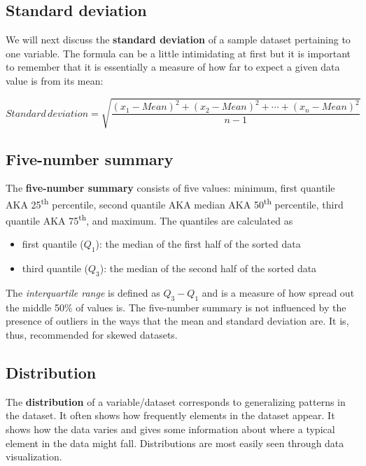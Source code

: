 \documentclass[12pt, krantz2,]{krantz}
\providecommand{\tightlist}{%
  \setlength{\itemsep}{0pt}\setlength{\parskip}{0pt}}
\begin{document}
\hypertarget{standard-deviation}{%
\subsection{Standard deviation}\label{standard-deviation}}

We will next discuss the \textbf{standard deviation} of a sample dataset pertaining to one variable. The formula can be a little intimidating at first but it is important to remember that it is essentially a measure of how far to expect a given data value is from its mean:

\[Standard \, deviation = \sqrt{\frac{(x_1 - Mean)^2 + (x_2 - Mean)^2 + \cdots + (x_n - Mean)^2}{n - 1}}\]

\hypertarget{five-number-summary}{%
\subsection{Five-number summary}\label{five-number-summary}}

The \textbf{five-number summary} consists of five values: minimum, first quantile AKA 25\textsuperscript{th} percentile, second quantile AKA median AKA 50\textsuperscript{th} percentile, third quantile AKA 75\textsuperscript{th}, and maximum. The quantiles are calculated as

\begin{itemize}
\tightlist
\item
  first quantile (\(Q_1\)): the median of the first half of the sorted data
\item
  third quantile (\(Q_3\)): the median of the second half of the sorted data
\end{itemize}

The \emph{interquartile range} is defined as \(Q_3 - Q_1\) and is a measure of how spread out the middle 50\% of values is. The five-number summary is not influenced by the presence of outliers in the ways that the mean and standard deviation are. It is, thus, recommended for skewed datasets.

\hypertarget{distribution}{%
\subsection{Distribution}\label{distribution}}

The \textbf{distribution} of a variable/dataset corresponds to generalizing patterns in the dataset. It often shows how frequently elements in the dataset appear. It shows how the data varies and gives some information about where a typical element in the data might fall. Distributions are most easily seen through data visualization.
\end{document}
